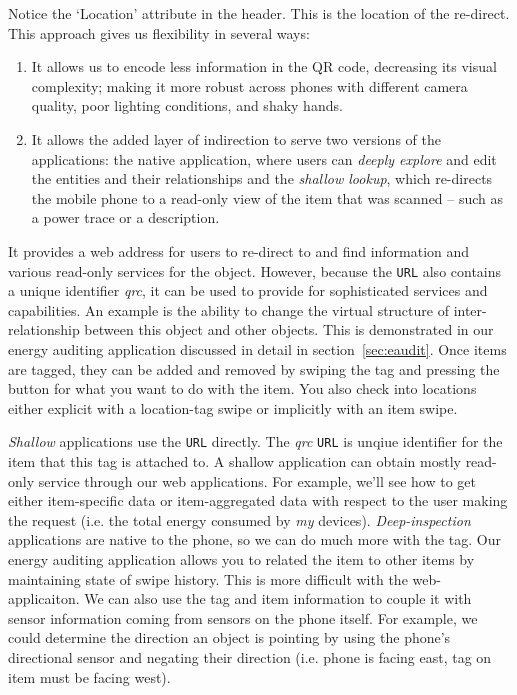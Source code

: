 Notice the `Location' attribute in the header.  This is the location of the re-direct.  This approach gives us
flexibility in several ways:

\begin{enumerate}
\item It allows us to encode less information in the QR code, decreasing its visual complexity; making it more
		robust across phones with different camera quality, poor lighting conditions, and shaky hands.
\item It allows the added layer of indirection to serve two versions of the applications:  the native application,
		where users can \emph{deeply explore} and edit the entities and their relationships and the \emph{shallow lookup}, 
		which re-directs the mobile phone to a read-only view of the item that was scanned -- such as a power trace or 
		a description.
\end{enumerate}


It provides a web address for users to re-direct to and find information and various read-only services for the object.  However, because
the \texttt{URL} also contains a unique identifier \emph{qrc}, it can be used to provide for sophisticated services and capabilities.
An example is the ability to change the virtual structure of inter-relationship between this object and other objects.  This
is demonstrated in our energy auditing application discussed in detail in section~\ref{sec:eaudit}.
Once items are tagged, they can be added and removed by swiping the tag and pressing the button for what you want to do with
the item.  You also check into locations either explicit with a location-tag swipe or implicitly with an item swipe.

\emph{Shallow} applications
use the \texttt{URL} directly.  The \emph{qrc} \texttt{URL} is unqiue identifier for the item that this tag is attached to.
A shallow application can obtain mostly read-only service through our web applications.  For example, we'll see how
to get either item-specific data or item-aggregated data with respect to the user making the request (i.e. the total
energy consumed by \emph{my} devices).  \emph{Deep-inspection} applications are native to the phone, so we can do much
more with the tag.  Our energy auditing application allows you to related the item to other items by maintaining state of swipe
history.  This is more difficult with the web-applicaiton.  We can also use the tag and item information to couple it with
sensor information coming from sensors on the phone itself.  For example, we could determine the direction an object
is pointing by using the phone's directional sensor and negating their direction (i.e. phone is facing east, tag on item must
be facing west).

